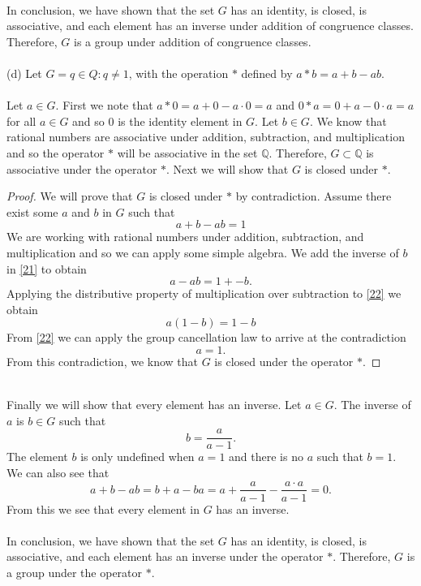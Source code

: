 \documentclass[11pt,a4paper]{article}
\begin{document}
~\\
In conclusion, we have shown that the set $G$ has an identity, is closed, is associative, and each element has an inverse under addition of congruence classes. Therefore, $G$ is a group under addition of congruence classes.\\
~\\
(d) Let  $G = {q \in Q : q \neq 1}$, with the operation $*$ defined by $a * b = a + b - ab$.\\
~\\
Let $a\in G$. First we note that $a * 0 = a + 0 - a\cdot 0 = a$ and $0 * a = 0 + a - 0\cdot a = a$ for all $a\in G$ and so $0$ is the identity element in $G$. Let $b\in G$. We know that rational numbers are associative under addition, subtraction, and multiplication and so the operator $*$ will be associative in the set $\mathbb{Q}$. Therefore, $G\subset \mathbb{Q}$ is associative under the operator $*$. Next we will show that $G$ is closed under $*$.
\begin{proof}
We will prove that $G$ is closed under $*$ by contradiction. Assume there exist some $a$ and $b$ in $G$ such that
\begin{equation}\label{21}
a+b - ab = 1
\end{equation}
We are working with rational numbers under addition, subtraction, and multiplication and so we can apply some simple algebra. We add the inverse of $b$ in \eqref{21} to obtain
\begin{equation}\label{22}
a-ab = 1 + -b.
\end{equation}
Applying the distributive property of multiplication over subtraction to \eqref{22} we obtain
\begin{equation}\label{23}
a(1-b) = 1-b
\end{equation}
From \eqref{22} we can apply the group cancellation law to arrive at the contradiction
\[a = 1.\]
From this contradiction, we know that $G$ is closed under the operator $*$. 
\end{proof}
~\\
Finally we will show that every element has an inverse. Let $a\in G$. The inverse of $a$ is $b\in G$ such that
\[b = \dfrac{a}{a-1}.\] The element $b$ is only undefined when $a = 1$ and there is no $a$ such that $b=1$. We can also see that \[a+b-ab = b+a-ba = a + \dfrac{a}{a-1} - \dfrac{a\cdot a}{a-1} = 0.\]
From this we see that every element in $G$ has an inverse.\\
~\\
In conclusion, we have shown that the set $G$ has an identity, is closed, is associative, and each element has an inverse under the operator $*$. Therefore, $G$ is a group under the operator $*$.\\
\end{document}
